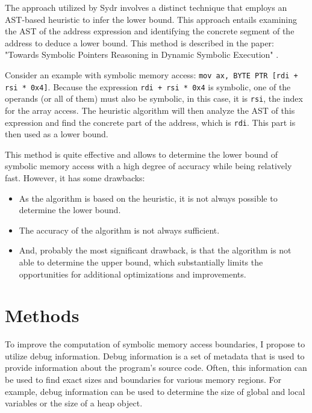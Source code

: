 \documentclass[conference]{IEEEtran}
\begin{document}
The approach utilized by Sydr \cite{sydr-cutting-edge-dynamic-symbolic-execution} involves a distinct technique that employs an AST-based heuristic to infer the lower bound. This approach entails examining the AST of the address expression and identifying the concrete segment of the address to deduce a lower bound. This method is described in the paper: "Towards Symbolic Pointers Reasoning in Dynamic Symbolic Execution" \cite{symbolic-pointers-reasoning}.

Consider an example with symbolic memory access: \texttt{mov ax, BYTE PTR [rdi + rsi * 0x4]}. Because the expression \texttt{rdi + rsi * 0x4} is symbolic, one of the operands (or all of them) must also be symbolic, in this case, it is \texttt{rsi}, the index for the array access. The heuristic algorithm will then analyze the AST of this expression and find the concrete part of the address, which is \texttt{rdi}. This part is then used as a lower bound.

This method is quite effective and allows to determine the lower bound of symbolic memory access with a high degree of accuracy while being relatively fast. However, it has some drawbacks:

\begin{itemize}
    \item As the algorithm is based on the heuristic, it is not always possible to determine the lower bound.
    \item The accuracy of the algorithm is not always sufficient.
    \item And, probably the most significant drawback, is that the algorithm is not able to determine the upper bound, which substantially limits the opportunities for additional optimizations and improvements.
\end{itemize}


\section{Methods}

To improve the computation of symbolic memory access boundaries, I propose to utilize debug information. Debug information is a set of metadata that is used to provide information about the program's source code. Often, this information can be used to find exact sizes and boundaries for various memory regions. For example, debug information can be used to determine the size of global and local variables or the size of a heap object.
\end{document}
